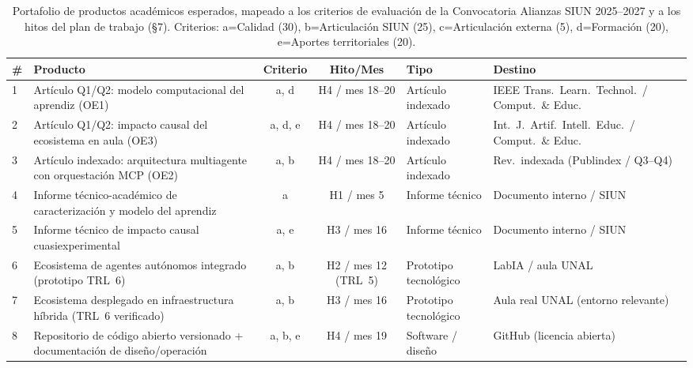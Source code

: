 \begin{table}[h]
\centering
\small
\caption{Portafolio de productos académicos esperados, mapeado a los criterios
de evaluación de la Convocatoria Alianzas SIUN 2025--2027 y a los hitos del plan
de trabajo (\S7). Criterios: a=Calidad (30), b=Articulación SIUN (25),
c=Articulación externa (5), d=Formación (20), e=Aportes territoriales (20).}
\label{tab:productos}
\begin{tabularx}{\textwidth}{@{}l X c c l X@{}}
\toprule
\textbf{\#} & \textbf{Producto} & \textbf{Criterio} & \textbf{Hito/Mes} & \textbf{Tipo} & \textbf{Destino} \\
\midrule

1 & Artículo Q1/Q2: modelo computacional del aprendiz (OE1)
  & a, d & H4 / mes 18--20 & Artículo indexado
  & IEEE Trans.\ Learn.\ Technol.\ / Comput.\ \& Educ. \\

2 & Artículo Q1/Q2: impacto causal del ecosistema en aula (OE3)
  & a, d, e & H4 / mes 18--20 & Artículo indexado
  & Int.\ J.\ Artif.\ Intell.\ Educ.\ / Comput.\ \& Educ. \\

3 & Artículo indexado: arquitectura multiagente con orquestación MCP (OE2)
  & a, b & H4 / mes 18--20 & Artículo indexado
  & Rev.\ indexada (Publindex / Q3--Q4) \\

4 & Informe técnico-académico de caracterización y modelo del aprendiz
  & a & H1 / mes 5 & Informe técnico
  & Documento interno / SIUN \\

5 & Informe técnico de impacto causal cuasiexperimental
  & a, e & H3 / mes 16 & Informe técnico
  & Documento interno / SIUN \\

\addlinespace
6 & Ecosistema de agentes autónomos integrado (prototipo TRL~6)
  & a, b & H2 / mes 12 (TRL~5) & Prototipo tecnológico
  & LabIA / aula UNAL \\

7 & Ecosistema desplegado en infraestructura híbrida (TRL~6 verificado)
  & a, b & H3 / mes 16 & Prototipo tecnológico
  & Aula real UNAL (entorno relevante) \\

8 & Repositorio de código abierto versionado + documentación de diseño/operación
  & a, b, e & H4 / mes 19 & Software / diseño
  & GitHub (licencia abierta) \\


\end{tabularx}
\end{table}
